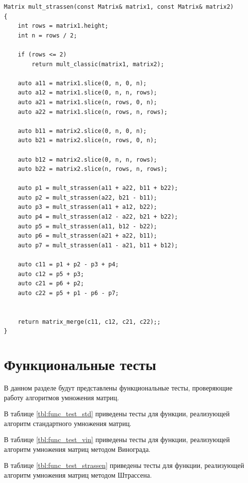 \begin{lstlisting}[caption=Алгоритм Штрассена]
Matrix mult_strassen(const Matrix& matrix1, const Matrix& matrix2)
{
    int rows = matrix1.height;
    int n = rows / 2;

    if (rows <= 2)
        return mult_classic(matrix1, matrix2);

    auto a11 = matrix1.slice(0, n, 0, n);
    auto a12 = matrix1.slice(0, n, n, rows);
    auto a21 = matrix1.slice(n, rows, 0, n);
    auto a22 = matrix1.slice(n, rows, n, rows);

    auto b11 = matrix2.slice(0, n, 0, n);
    auto b21 = matrix2.slice(n, rows, 0, n);

    auto b12 = matrix2.slice(0, n, n, rows);
    auto b22 = matrix2.slice(n, rows, n, rows);

    auto p1 = mult_strassen(a11 + a22, b11 + b22);
    auto p2 = mult_strassen(a22, b21 - b11);
    auto p3 = mult_strassen(a11 + a12, b22);
    auto p4 = mult_strassen(a12 - a22, b21 + b22);
    auto p5 = mult_strassen(a11, b12 - b22);
    auto p6 = mult_strassen(a21 + a22, b11);
    auto p7 = mult_strassen(a11 - a21, b11 + b12);

    auto c11 = p1 + p2 - p3 + p4;
    auto c12 = p5 + p3;
    auto c21 = p6 + p2;
    auto c22 = p5 + p1 - p6 - p7;


    return matrix_merge(c11, c12, c21, c22);;
}
\end{lstlisting}
\clearpage
\section{Функциональные тесты}

В данном разделе будут представлены функциональные тесты, проверяющие работу алгоритмов умножения матриц.

В таблице \ref{tbl:func_test_std} приведены тесты для функции, реализующей алгоритм стандартного умножения матриц.

В таблице \ref{tbl:func_test_vin} приведены тесты для функции, реализующей алгоритм умножения матриц методом Винограда.

В таблице \ref{tbl:func_test_strassen} приведены тесты для функции, реализующей алгоритм умножения матриц методом Штрассена.

